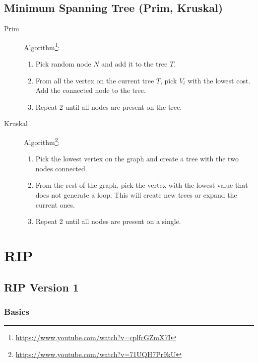 \documentclass{article}
\begin{document}
\subsection{Minimum Spanning Tree (Prim, Kruskal)}

\begin{description}
   	\item[Prim] Algorithm\footnote{\url{https://www.youtube.com/watch?v=cplfcGZmX7I}}:
   	\begin{enumerate}
   		\item Pick random node $N$ and add it to the tree $T$.
   		\item From all the vertex on the current tree $T$, pick $V_{i}$ with the lowest cost. Add the connected node to the tree.
   		\item Repeat 2 until all nodes are present on the tree.
	\end{enumerate}
   	\item[Kruskal] Algorithm\footnote{\url{https://www.youtube.com/watch?v=71UQH7Pr9kU}}:
   	\begin{enumerate}
   		\item Pick the lowest vertex on the graph and create a tree with the two nodes connected.
   		\item From the rest of the graph, pick the vertex with the lowest value that does not generate a loop. This will create new trees or expand the current ones.
   		\item Repeat 2 until all nodes are present on a single.
	\end{enumerate}
\end{description}



\newpage




\section{RIP}



\subsection{RIP Version 1}

\subsubsection{Basics}
\end{document}
